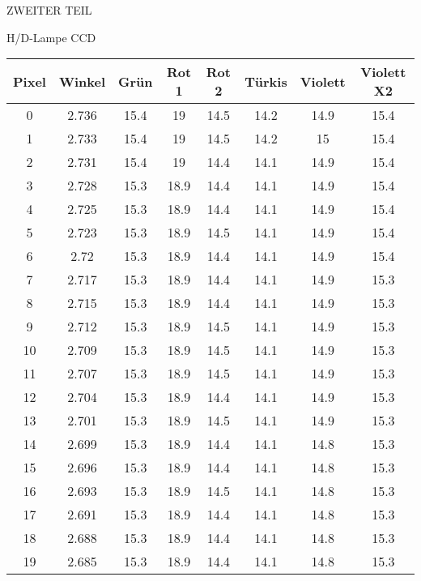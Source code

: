 \begin{appendix}
\begin{chapter}{ZWEITER TEIL}
\begin{section}{H/D-Lampe CCD}
        \begin{scriptsize}
          \begin{longtable}[htbp]{|c|c|c|c|c|c|c|c|}
            \hline
            Pixel & Winkel & Grün & Rot 1 & Rot 2 & Türkis & Violett &
                Violett X2  \\ \hline\hline \endhead
            0&2.736 & 15.4 & 19 & 14.5 & 14.2 & 14.9 & 15.4 \\ \hline
            1 & 2.733 & 15.4 & 19 & 14.5 & 14.2 & 15 & 15.4 \\ \hline
            2 & 2.731 & 15.4 & 19 & 14.4 & 14.1 & 14.9 & 15.4 \\ \hline
            3 & 2.728 & 15.3 & 18.9 & 14.4 & 14.1 & 14.9 & 15.4 \\ \hline
            4 & 2.725 & 15.3 & 18.9 & 14.4 & 14.1 & 14.9 & 15.4 \\ \hline
            5 & 2.723 & 15.3 & 18.9 & 14.5 & 14.1 & 14.9 & 15.4 \\ \hline
            6 & 2.72 & 15.3 & 18.9 & 14.4 & 14.1 & 14.9 & 15.4 \\ \hline
            7 & 2.717 & 15.3 & 18.9 & 14.4 & 14.1 & 14.9 & 15.3 \\ \hline
            8 & 2.715 & 15.3 & 18.9 & 14.4 & 14.1 & 14.9 & 15.3 \\ \hline
            9 & 2.712 & 15.3 & 18.9 & 14.5 & 14.1 & 14.9 & 15.3 \\ \hline
            10 & 2.709 & 15.3 & 18.9 & 14.5 & 14.1 & 14.9 & 15.3 \\ \hline
            11 & 2.707 & 15.3 & 18.9 & 14.5 & 14.1 & 14.9 & 15.3 \\ \hline
            12 & 2.704 & 15.3 & 18.9 & 14.4 & 14.1 & 14.9 & 15.3 \\ \hline
            13 & 2.701 & 15.3 & 18.9 & 14.5 & 14.1 & 14.9 & 15.3 \\ \hline
            14 & 2.699 & 15.3 & 18.9 & 14.4 & 14.1 & 14.8 & 15.3 \\ \hline
            15 & 2.696 & 15.3 & 18.9 & 14.4 & 14.1 & 14.8 & 15.3 \\ \hline
            16 & 2.693 & 15.3 & 18.9 & 14.5 & 14.1 & 14.8 & 15.3 \\ \hline
            17 & 2.691 & 15.3 & 18.9 & 14.4 & 14.1 & 14.8 & 15.3 \\ \hline
            18 & 2.688 & 15.3 & 18.9 & 14.4 & 14.1 & 14.8 & 15.3 \\ \hline
            19 & 2.685 & 15.3 & 18.9 & 14.4 & 14.1 & 14.8 & 15.3 \\ \hline

\end{longtable}
\end{scriptsize}
\end{section}
\end{chapter}
\end{appendix}

